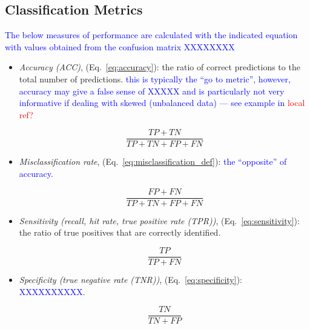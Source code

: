 \subsection{Classification Metrics}

\textcolor{blue}{The below measures of performance are calculated with the indicated equation with values obtained from the confusion matrix XXXXXXXX}

\begin{itemize}
	
\item \textit{Accuracy (ACC)}, (Eq.~\ref{eq:accuracy}): the ratio of correct predictions to the total number of predictions. \textcolor{blue}{this is typically the ``go to metric'', however, accuracy may give a false sense of XXXXX and is particularly not very informative if dealing with skewed (unbalanced data) --- see example in \textcolor{red}{local ref?}}

\begin{equation}
{\frac{TP+TN}{TP+TN+FP+FN}}
\label{eq:accuracy}
\end{equation}

\item \textit{Misclassification rate}, (Eq.~\ref{eq:misclassification_def}): \textcolor{blue}{the ``opposite'' of accuracy}.

\begin{equation}
{\frac{FP+FN}{TP+TN+FP+FN}}
\label{eq:misclassification_def}
\end{equation}


\item \textit{Sensitivity (recall, hit rate, true positive rate (TPR))}, (Eq.~\ref{eq:sensitivity}): the ratio of true positives that are correctly identified.

\begin{equation}
{\frac{TP}{TP+FN}}
\label{eq:sensitivity}
\end{equation}

\item \textit{Specificity (true negative rate (TNR))}, (Eq.~\ref{eq:specificity}): \textcolor{blue}{XXXXXXXXXX}.

\begin{equation}
{\frac{TN}{TN+FP}}
\label{eq:specificity}
\end{equation}


\end{itemize}
